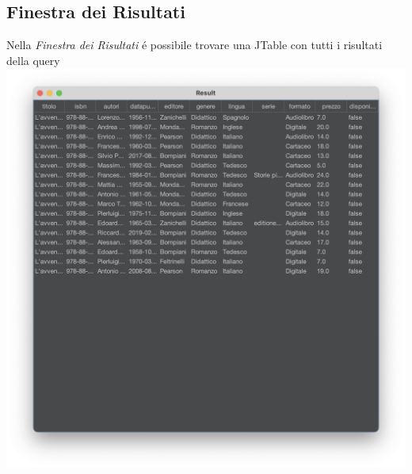  \subsection{Finestra dei Risultati}
 Nella \textit{Finestra dei Risultati} \'e possibile trovare una JTable con tutti i risultati della query
 \\
 \includegraphics[scale=0.25, center]{Immagini/Schermate/Search/ResultPage.png}


